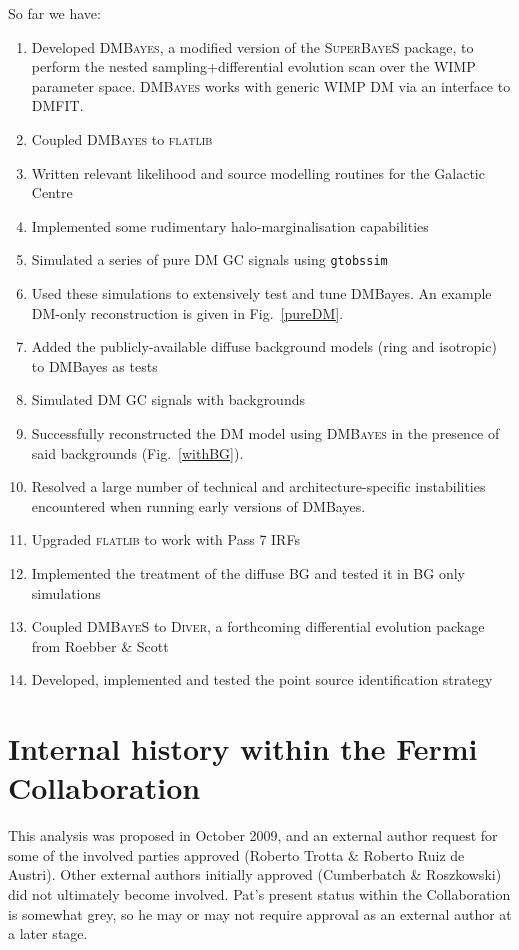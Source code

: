 \documentclass{article}
\begin{document}
So far we have:
\begin{enumerate}
\item Developed \textsc{DMBayes}, a modified version of the \textsc{SuperBayeS} package, to perform the nested sampling+differential evolution scan over the WIMP parameter space.  \textsc{DMBayes} works with generic WIMP DM via an interface to \textsc{DMFIT}.
\item Coupled \textsc{DMBayes} to \textsc{flatlib} 
\item Written relevant likelihood and source modelling routines for the Galactic Centre
\item Implemented some rudimentary halo-marginalisation capabilities
\item Simulated a series of pure DM GC signals using \texttt{gtobssim}
\item Used these simulations to extensively test and tune DMBayes.  An example DM-only reconstruction is given in Fig.~\ref{pureDM}.
\item Added the publicly-available diffuse background models (ring and isotropic) to DMBayes as tests
\item Simulated DM GC signals with backgrounds
\item Successfully reconstructed the DM model using \textsc{DMBayes} in the presence of said backgrounds (Fig.~\ref{withBG}).
\item Resolved a large number of technical and architecture-specific instabilities encountered when running early versions of DMBayes.
\item Upgraded \textsc{flatlib} to work with Pass 7 IRFs
\item Implemented the treatment of the diffuse BG and tested it in BG only simulations
\item Coupled \textsc{DMBayeS} to \textsc{Diver}, a forthcoming differential evolution package from Roebber \& Scott
\item Developed, implemented and tested the point source identification strategy
\end{enumerate}

\section{Internal history within the Fermi Collaboration}

This analysis was proposed in October 2009, and an external author request for some of the involved parties approved (Roberto Trotta \& Roberto Ruiz de Austri).  Other external authors initially approved (Cumberbatch \& Roszkowski) did not ultimately become involved.  Pat's present status within the Collaboration is somewhat grey, so he may or may not require approval as an external author at a later stage.
\end{document}

